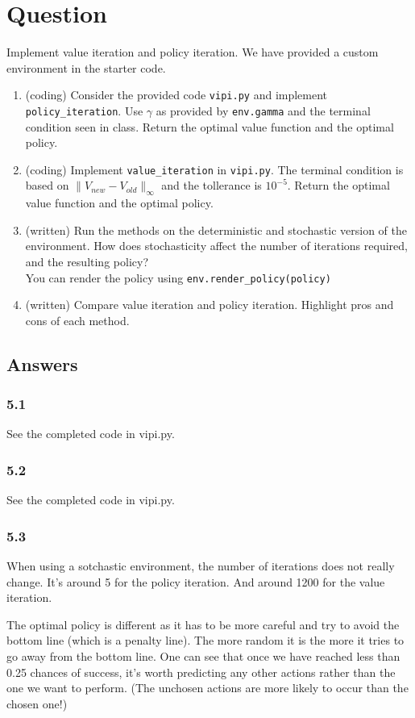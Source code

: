 \documentclass[a4paper]{article}
\begin{document}
\section{Question}
Implement value iteration and policy iteration. We have provided a custom environment in the starter code.
\begin{enumerate}
    \item (coding) Consider the provided code \texttt{vipi.py} and implement \texttt{policy\_iteration}. Use $\gamma$ as provided by \texttt{env.gamma} and the terminal condition seen in class. Return the optimal value function and the optimal policy.
    \item (coding) Implement \texttt{value\_iteration} in \texttt{vipi.py}. The terminal condition is based on $\|V_{new} - V_{old}\|_{\infty}$ and the tollerance is $10^{-5}$. Return the optimal value function and the optimal policy.
    \item (written) Run the methods on the deterministic and stochastic version of the environment. How does stochasticity affect the number of iterations required, and the resulting policy?\\
          You can render the policy using \texttt{env.render\_policy(policy)}
    \item (written) Compare value iteration and policy iteration. Highlight pros and cons of each method.
\end{enumerate}


\subsection*{Answers}
\subsubsection*{5.1}
See the completed code in vipi.py.
\subsubsection*{5.2}
See the completed code in vipi.py.
\subsubsection*{5.3}
When using a sotchastic environment, the number of iterations does not really change. It's around 5 for the policy iteration. And around 1200 for
the value iteration.

The optimal policy is different as it has to be more careful and try to avoid the bottom line (which is a penalty line). The more random it is the more
it tries to go away from the bottom line. One can see that once we have reached less than 0.25 chances of success, it's worth predicting any other actions
rather than the one we want to perform. (The unchosen actions are more likely to occur than the chosen one!)
\end{document}
